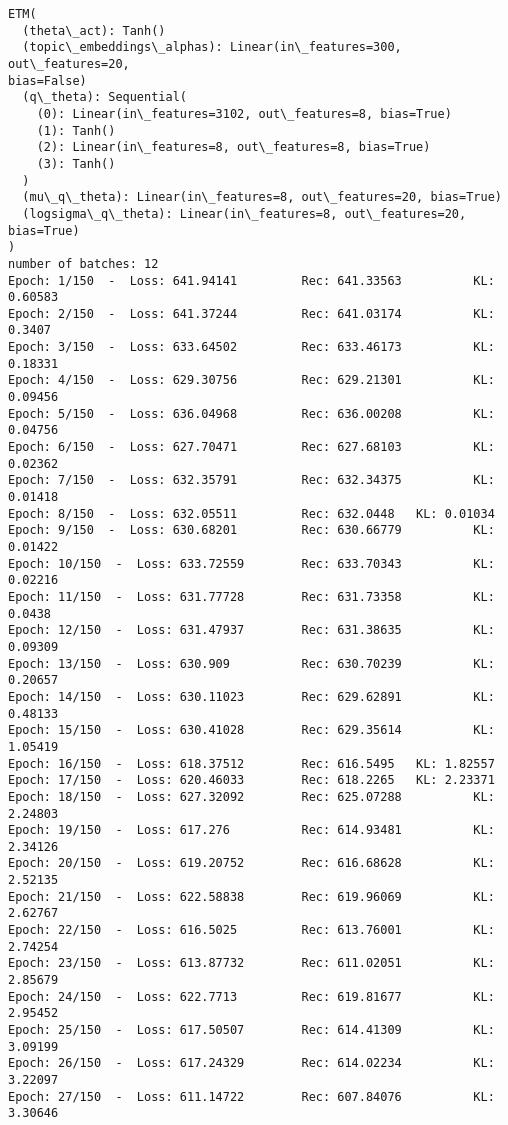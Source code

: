 \documentclass[11pt]{article}
\begin{document}
    \begin{Verbatim}[commandchars=\\\{\}]
ETM(
  (theta\_act): Tanh()
  (topic\_embeddings\_alphas): Linear(in\_features=300, out\_features=20,
bias=False)
  (q\_theta): Sequential(
    (0): Linear(in\_features=3102, out\_features=8, bias=True)
    (1): Tanh()
    (2): Linear(in\_features=8, out\_features=8, bias=True)
    (3): Tanh()
  )
  (mu\_q\_theta): Linear(in\_features=8, out\_features=20, bias=True)
  (logsigma\_q\_theta): Linear(in\_features=8, out\_features=20, bias=True)
)
number of batches: 12
Epoch: 1/150  -  Loss: 641.94141         Rec: 641.33563          KL: 0.60583
Epoch: 2/150  -  Loss: 641.37244         Rec: 641.03174          KL: 0.3407
Epoch: 3/150  -  Loss: 633.64502         Rec: 633.46173          KL: 0.18331
Epoch: 4/150  -  Loss: 629.30756         Rec: 629.21301          KL: 0.09456
Epoch: 5/150  -  Loss: 636.04968         Rec: 636.00208          KL: 0.04756
Epoch: 6/150  -  Loss: 627.70471         Rec: 627.68103          KL: 0.02362
Epoch: 7/150  -  Loss: 632.35791         Rec: 632.34375          KL: 0.01418
Epoch: 8/150  -  Loss: 632.05511         Rec: 632.0448   KL: 0.01034
Epoch: 9/150  -  Loss: 630.68201         Rec: 630.66779          KL: 0.01422
Epoch: 10/150  -  Loss: 633.72559        Rec: 633.70343          KL: 0.02216
Epoch: 11/150  -  Loss: 631.77728        Rec: 631.73358          KL: 0.0438
Epoch: 12/150  -  Loss: 631.47937        Rec: 631.38635          KL: 0.09309
Epoch: 13/150  -  Loss: 630.909          Rec: 630.70239          KL: 0.20657
Epoch: 14/150  -  Loss: 630.11023        Rec: 629.62891          KL: 0.48133
Epoch: 15/150  -  Loss: 630.41028        Rec: 629.35614          KL: 1.05419
Epoch: 16/150  -  Loss: 618.37512        Rec: 616.5495   KL: 1.82557
Epoch: 17/150  -  Loss: 620.46033        Rec: 618.2265   KL: 2.23371
Epoch: 18/150  -  Loss: 627.32092        Rec: 625.07288          KL: 2.24803
Epoch: 19/150  -  Loss: 617.276          Rec: 614.93481          KL: 2.34126
Epoch: 20/150  -  Loss: 619.20752        Rec: 616.68628          KL: 2.52135
Epoch: 21/150  -  Loss: 622.58838        Rec: 619.96069          KL: 2.62767
Epoch: 22/150  -  Loss: 616.5025         Rec: 613.76001          KL: 2.74254
Epoch: 23/150  -  Loss: 613.87732        Rec: 611.02051          KL: 2.85679
Epoch: 24/150  -  Loss: 622.7713         Rec: 619.81677          KL: 2.95452
Epoch: 25/150  -  Loss: 617.50507        Rec: 614.41309          KL: 3.09199
Epoch: 26/150  -  Loss: 617.24329        Rec: 614.02234          KL: 3.22097
Epoch: 27/150  -  Loss: 611.14722        Rec: 607.84076          KL: 3.30646

\end{Verbatim}
\end{document}
